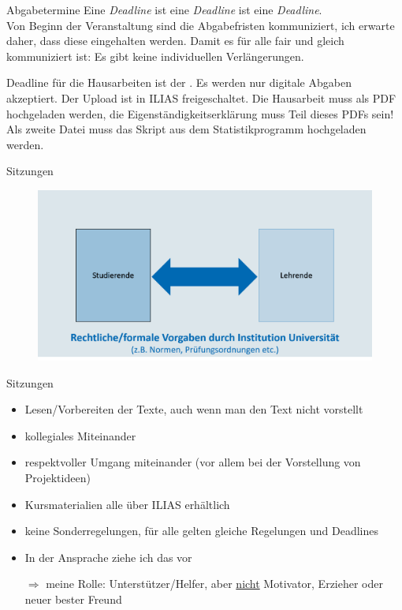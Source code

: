 \documentclass[11pt]{beamer}
\begin{document}
\begin{frame}[t]{Abgabetermine}
Eine \textit{Deadline} ist eine \textit{Deadline} ist eine \textit{Deadline}. \\

Von Beginn der Veranstaltung sind die Abgabefristen kommuniziert, ich erwarte daher, dass diese eingehalten werden. Damit es für alle fair und gleich kommuniziert ist: Es gibt keine individuellen Verlängerungen.

\pause

Deadline für die Hausarbeiten ist der . Es werden nur digitale Abgaben akzeptiert. Der Upload ist in ILIAS freigeschaltet. Die Hausarbeit muss als PDF hochgeladen werden, die Eigenständigkeitserklärung muss Teil dieses PDFs sein! Als zweite Datei muss das Skript aus dem Statistikprogramm hochgeladen werden. 

\end{frame}

\begin{frame}[t]{Sitzungen}
	\begin{center}
		\begin{figure}[ht]
			\includegraphics[width=\textwidth]{pics/pre7.png}
		\end{figure}	
	\end{center}
\end{frame}

\begin{frame}[t]{Sitzungen}

	\begin{itemize}
		\item Lesen/Vorbereiten der Texte, auch wenn man den Text nicht vorstellt
		\item kollegiales Miteinander
		\item respektvoller Umgang miteinander (vor allem bei der Vorstellung von Projektideen)
		\item Kursmaterialien alle über ILIAS erhältlich
		\item keine Sonderregelungen, für alle gelten gleiche Regelungen und Deadlines
		\item In der Ansprache ziehe ich das  vor
		\pause
		\item[$\Rightarrow$] meine Rolle: Unterstützer/Helfer, aber \underline{nicht} Motivator, Erzieher oder neuer bester Freund
	\end{itemize}
\end{frame}
\end{document}
